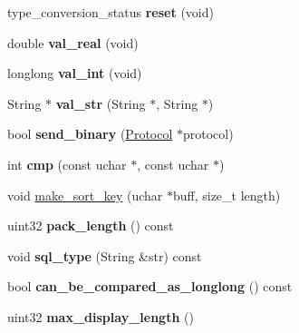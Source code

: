 \begin{DoxyCompactItemize}
\item 
\mbox{\label{classField__longlong_a25aaab5f1f122e1eace824db365077c7}} 
type\+\_\+conversion\+\_\+status {\bfseries reset} (void)
\item 
\mbox{\label{classField__longlong_aacd3d96c3fc6b43cd0438c6637a70c8f}} 
double {\bfseries val\+\_\+real} (void)
\item 
\mbox{\label{classField__longlong_a8769426032a10d600eec2f04e9fb52aa}} 
longlong {\bfseries val\+\_\+int} (void)
\item 
\mbox{\label{classField__longlong_a3a6194f2ec83141d889f8b361583abfe}} 
String $\ast$ {\bfseries val\+\_\+str} (String $\ast$, String $\ast$)
\item 
\mbox{\label{classField__longlong_ad1903f5c198eb2a0400bc0fb470f1664}} 
bool {\bfseries send\+\_\+binary} (\mbox{\hyperlink{classProtocol}{Protocol}} $\ast$protocol)
\item 
\mbox{\label{classField__longlong_aa12e1822af9d1679404c3d45f298b1df}} 
int {\bfseries cmp} (const uchar $\ast$, const uchar $\ast$)
\item 
void \mbox{\hyperlink{classField__longlong_ac58073f392f57b9c2c7c158880f5578a}{make\+\_\+sort\+\_\+key}} (uchar $\ast$buff, size\+\_\+t length)
\item 
\mbox{\label{classField__longlong_ac8d2c9b190fef092781e63ee26183c1b}} 
uint32 {\bfseries pack\+\_\+length} () const
\item 
\mbox{\label{classField__longlong_a09213d844758edee2c73e274c586be6e}} 
void {\bfseries sql\+\_\+type} (String \&str) const
\item 
\mbox{\label{classField__longlong_adff9b92bd221916156be7028ca30762c}} 
bool {\bfseries can\+\_\+be\+\_\+compared\+\_\+as\+\_\+longlong} () const
\item 
\mbox{\label{classField__longlong_a0ee7f6f4c0087a34207027a581a25450}} 
uint32 {\bfseries max\+\_\+display\+\_\+length} ()

\end{DoxyCompactItemize}
